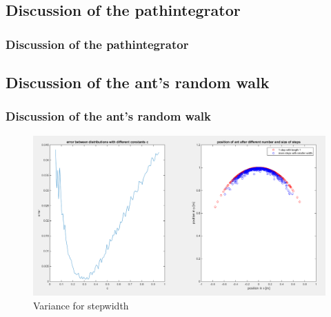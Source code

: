 \documentclass[ignorenonframetext]{beamer}
\begin{document}
\subsection{Discussion of the pathintegrator}
\begin{frame}
\frametitle{Discussion of the pathintegrator}








\end{frame}



\subsection{Discussion of the ant's random walk}
\begin{frame}
\frametitle{Discussion of the ant's random walk}
\begin{figure}[H]
\centering
\includegraphics[scale=0.2]{./Pics/VarianceForStepWidth_plot.png} 
\caption{Variance for stepwidth}
\end{figure} 
\end{frame}
\end{document}
